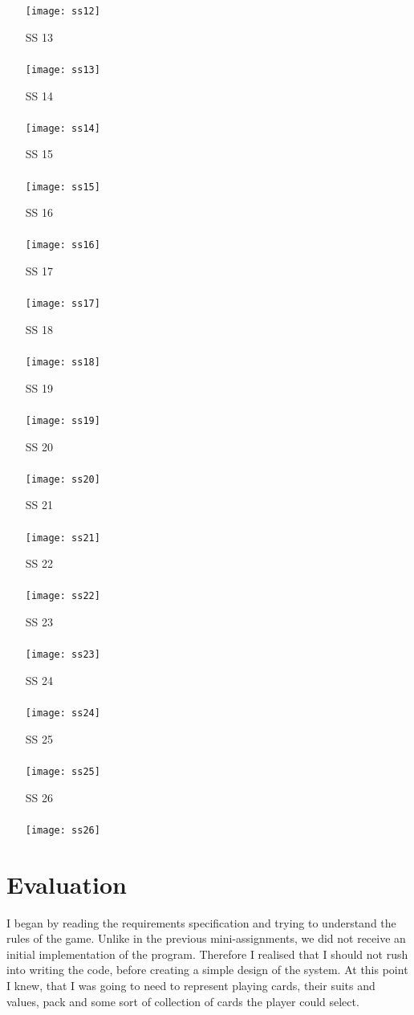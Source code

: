 \documentclass[a4paper, 11pt, titlepage]{article}
\begin{document}
\begin{enumerate}
		\texttt{[image: ss12]} \newpage
	\item[SS]13\\\\ 
		\texttt{[image: ss13]}
	\item[SS]14\\\\ 
		\texttt{[image: ss14]} \newpage
	\item[SS]15\\\\ 
		\texttt{[image: ss15]}
	\item[SS]16\\\\ 
		\texttt{[image: ss16]} \newpage
	\item[SS]17\\\\ 
		\texttt{[image: ss17]}
	\item[SS]18\\\\ 
		\texttt{[image: ss18]} \newpage
	\item[SS]19\\\\ 
		\texttt{[image: ss19]}
	\item[SS]20\\\\ 
		\texttt{[image: ss20]} \newpage
	\item[SS]21\\\\ 
		\texttt{[image: ss21]}
	\item[SS]22\\\\ 
		\texttt{[image: ss22]} \newpage
	\item[SS]23\\\\ 
		\texttt{[image: ss23]}
	\item[SS]24\\\\ 
		\texttt{[image: ss24]} \newpage
	\item[SS]25\\\\ 
		\texttt{[image: ss25]}
	\item[SS]26\\\\ 
		\texttt{[image: ss26]}		
\end{enumerate}
\section{Evaluation}
I began by reading the requirements specification and trying to understand the rules
of the game. Unlike in the previous mini-assignments, we did not receive an initial 
implementation of the program. Therefore I realised that I should not rush into 
writing the code, before creating a simple design of the system. At this point I knew,
that I was going to need to represent playing cards, their suits and values, pack and 
some sort of collection of cards the player could select. 
\end{document}
